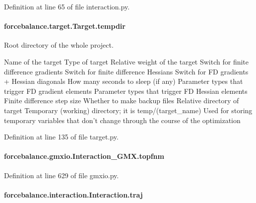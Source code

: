 Definition at line 65 of file interaction.\-py.

\hypertarget{classforcebalance_1_1target_1_1Target_aa1f01b5b78db253b5b66384ed11ed193}{
\paragraph[{tempdir}]{\setlength{\rightskip}{0pt plus 5cm}forcebalance.\-target.\-Target.\-tempdir\hspace{0.3cm}{\ttfamily [inherited]}}}\label{classforcebalance_1_1target_1_1Target_aa1f01b5b78db253b5b66384ed11ed193}


Root directory of the whole project. 

Name of the target Type of target Relative weight of the target Switch for finite difference gradients Switch for finite difference Hessians Switch for F\-D gradients + Hessian diagonals How many seconds to sleep (if any) Parameter types that trigger F\-D gradient elements Parameter types that trigger F\-D Hessian elements Finite difference step size Whether to make backup files Relative directory of target Temporary (working) directory; it is temp/(target\-\_\-name) Used for storing temporary variables that don't change through the course of the optimization 

Definition at line 135 of file target.\-py.

\hypertarget{classforcebalance_1_1gmxio_1_1Interaction__GMX_a8d43d5b83c331a64f7c97253ce64a9c8}{
\paragraph[{topfnm}]{\setlength{\rightskip}{0pt plus 5cm}forcebalance.\-gmxio.\-Interaction\-\_\-\-G\-M\-X.\-topfnm}}\label{classforcebalance_1_1gmxio_1_1Interaction__GMX_a8d43d5b83c331a64f7c97253ce64a9c8}


Definition at line 629 of file gmxio.\-py.

\hypertarget{classforcebalance_1_1interaction_1_1Interaction_af838808df9bf58ead305d079ccf21f8a}{
\paragraph[{traj}]{\setlength{\rightskip}{0pt plus 5cm}forcebalance.\-interaction.\-Interaction.\-traj\hspace{0.3cm}{\ttfamily [inherited]}}}\label{classforcebalance_1_1interaction_1_1Interaction_af838808df9bf58ead305d079ccf21f8a}


